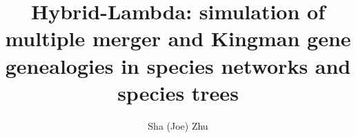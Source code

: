 \documentclass[12pt]{article}
\begin{document}
\title{Hybrid-Lambda: simulation of multiple merger and Kingman gene genealogies in species networks and species trees}
\author{Sha (Joe) Zhu}
\date{}
\maketitle



\end{document}
